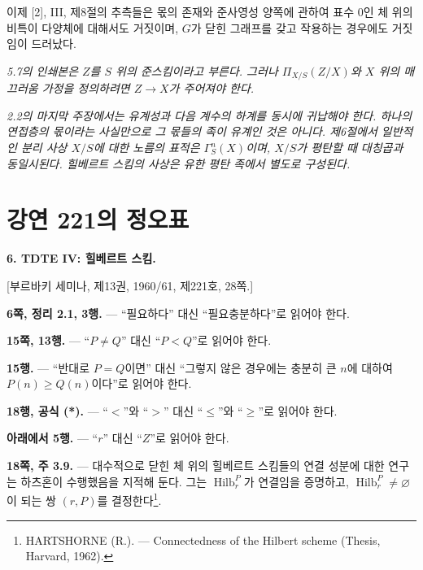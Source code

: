 \documentclass[11pt,twoside,openany]{book}
\numberwithin{equation}{section}
\newcommand{\sourceunit}{front}
\newcommand{\src}[1]{%
  \phantomsection\hypertarget{src:\sourceunit:#1}{}%
  \marginpar{\raggedleft\footnotesize\sffamily #1}%
}
\theoremstyle{plain}
\theoremstyle{definition}
\theoremstyle{remark}
\begin{document}
이제 [2], III, 제8절의 추측들은 몫의 존재와 준사영성 양쪽에 관하여 표수
0인 체 위의 비특이 다양체에 대해서도 거짓이며, $G$가 닫힌 그래프를 갖고
작용하는 경우에도 거짓임이 드러났다.

\par\smallskip
\begingroup\footnotesize




\noindent\textit{5.7의 인쇄본은 $Z$를 $S$ 위의 준스킴이라고 부른다. 그러나 $\Pi_{X/S}(Z/X)$와 $X$ 위의 매끄러움 가정을 정의하려면 $Z\to X$가 주어져야 한다.}\par
\noindent\textit{2.2의 마지막 주장에서는 유계성과 다음 계수의 하계를 동시에 귀납해야 한다. 하나의 연접층의 몫이라는 사실만으로 그 몫들의 족이 유계인 것은 아니다. 제6절에서 일반적인 분리 사상 $X/S$에 대한 노름의 표적은 $\Gamma^n_S(X)$이며, $X/S$가 평탄할 때 대칭곱과 동일시된다. 힐베르트 스킴의 사상은 유한 평탄 족에서 별도로 구성된다.}\par
\endgroup

\par
\renewcommand{\sourceunit}{e221}
\clearpage
\chapter*{강연 221의 정오표}
\setcounter{footnote}{3}
\src{302}

\noindent\textbf{6. TDTE IV: 힐베르트 스킴.}

\begin{center}
[부르바키 세미나, 제13권, 1960/61, 제221호, 28쪽.]
\end{center}

\noindent\textbf{6쪽, 정리 2.1, 3행.} --- ``필요하다'' 대신
``필요충분하다''로 읽어야 한다.

\noindent\textbf{15쪽, 13행.} --- ``$P\neq Q$'' 대신
``$P<Q$''로 읽어야 한다.

\noindent\textbf{15행.} --- ``반대로 $P=Q$이면'' 대신
``그렇지 않은 경우에는 충분히 큰 $n$에 대하여 $P(n)\geq Q(n)$이다''로
읽어야 한다.

\noindent\textbf{18행, 공식 (*).} --- ``$<$''와 ``$>$'' 대신
``$\leq$''와 ``$\geq$''로 읽어야 한다.

\noindent\textbf{아래에서 5행.} --- ``$r$'' 대신 ``$Z$''로
읽어야 한다.

\noindent\textbf{18쪽, 주 3.9.} --- 대수적으로 닫힌 체 위의 힐베르트
스킴들의 연결 성분에 대한 연구는 하츠혼이 수행했음을 지적해 둔다. 그는
$\operatorname{Hilb}^{P}_{r}$가 연결임을 증명하고,
$\operatorname{Hilb}^{P}_{r}\neq\varnothing$이 되는 쌍 $(r,P)$를
결정한다\footnote{HARTSHORNE (R.). --- Connectedness of the Hilbert
scheme (Thesis, Harvard, 1962).}.
\end{document}

